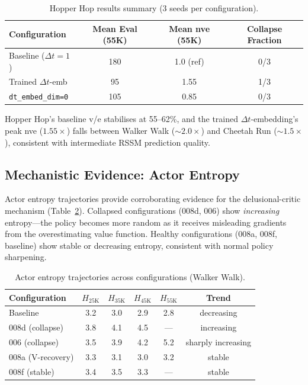 \documentclass[letterpaper]{article}
\begin{document}
\begin{table}[h]
\centering
\caption{Hopper Hop results summary (3 seeds per configuration).}
\label{tab:hopper}
\begin{tabular}{lccc}
\toprule
Configuration & Mean Eval (55K) & Mean nve (55K) & Collapse Fraction \\
\midrule
Baseline ($\Delta t{=}1$) & 180 & 1.0 (ref) & 0/3 \\
Trained $\Delta t$-emb & 95 & 1.55 & 1/3 \\
\texttt{dt\_embed\_dim=0} & 105 & 0.85 & 0/3 \\
\bottomrule
\end{tabular}
\end{table}

Hopper Hop's baseline v/e stabilises at 55--62\%, and the trained $\Delta t$-embedding's peak nve ($1.55\times$) falls between Walker Walk (${\sim}2.0\times$) and Cheetah Run (${\sim}1.5\times$), consistent with intermediate RSSM prediction quality.

\subsection{Mechanistic Evidence: Actor Entropy}
\label{sec:entropy}

Actor entropy trajectories provide corroborating evidence for the delusional-critic mechanism (Table~\ref{tab:entropy}).
Collapsed configurations (008d, 006) show \emph{increasing} entropy---the policy becomes more random as it receives misleading gradients from the overestimating value function.
Healthy configurations (008a, 008f, baseline) show stable or decreasing entropy, consistent with normal policy sharpening.

\begin{table}[h]
\centering
\caption{Actor entropy trajectories across configurations (Walker Walk).}
\label{tab:entropy}
\begin{tabular}{lccccc}
\toprule
Configuration & $H_{\text{25K}}$ & $H_{\text{35K}}$ & $H_{\text{45K}}$ & $H_{\text{55K}}$ & Trend \\
\midrule
Baseline & 3.2 & 3.0 & 2.9 & 2.8 & decreasing \\
008d (collapse) & 3.8 & 4.1 & 4.5 & --- & increasing \\
006 (collapse) & 3.5 & 3.9 & 4.2 & 5.2 & sharply increasing \\
008a (V-recovery) & 3.3 & 3.1 & 3.0 & 3.2 & stable \\
008f (stable) & 3.4 & 3.5 & 3.3 & --- & stable \\
\bottomrule
\end{tabular}
\end{table}
\end{document}
